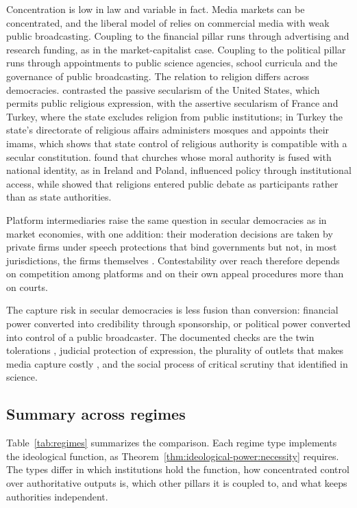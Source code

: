 \documentclass[11pt,letterpaper]{article}
\theoremstyle{definition}
\theoremstyle{remark}
\begin{document}
Concentration is low in law and variable in fact. Media markets can be concentrated, and the liberal model of \citet{hallin2004} relies on commercial media with weak public broadcasting. Coupling to the financial pillar runs through advertising and research funding, as in the market-capitalist case. Coupling to the political pillar runs through appointments to public science agencies, school curricula and the governance of public broadcasting. The relation to religion differs across democracies. \citet{kuru2009} contrasted the passive secularism of the United States, which permits public religious expression, with the assertive secularism of France and Turkey, where the state excludes religion from public institutions; in Turkey the state's directorate of religious affairs administers mosques and appoints their imams, which shows that state control of religious authority is compatible with a secular constitution. \citet{grzymala2015} found that churches whose moral authority is fused with national identity, as in Ireland and Poland, influenced policy through institutional access, while \citet{casanova1994} showed that religions entered public debate as participants rather than as state authorities.

Platform intermediaries raise the same question in secular democracies as in market economies, with one addition: their moderation decisions are taken by private firms under speech protections that bind governments but not, in most jurisdictions, the firms themselves \citep{gillespie2019}. Contestability over reach therefore depends on competition among platforms and on their own appeal procedures more than on courts.

The capture risk in secular democracies is less fusion than conversion: financial power converted into credibility through sponsorship, or political power converted into control of a public broadcaster. The documented checks are the twin tolerations \citep{stepan2000}, judicial protection of expression, the plurality of outlets that makes media capture costly \citep{besley2006}, and the social process of critical scrutiny that \citet{oreskes2019} identified in science.

\subsection{Summary across regimes}

Table~\ref{tab:regimes} summarizes the comparison. Each regime type implements the ideological function, as Theorem~\ref{thm:ideological-power:necessity} requires. The types differ in which institutions hold the function, how concentrated control over authoritative outputs is, which other pillars it is coupled to, and what keeps authorities independent.
\end{document}
